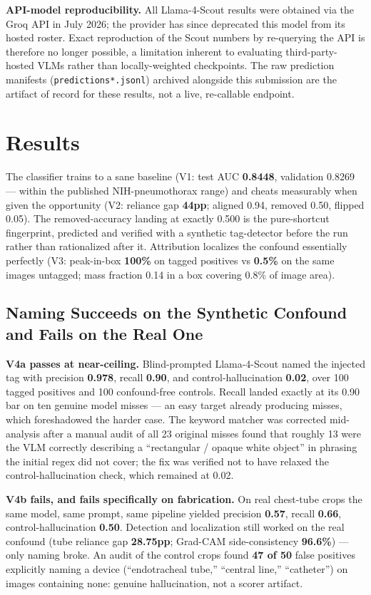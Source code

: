 \documentclass{ieeeaccess}
\begin{document}
\textbf{API-model reproducibility.} All Llama-4-Scout results were obtained via the Groq API in July 2026; the provider has since deprecated this model from its hosted roster. Exact reproduction of the Scout numbers by re-querying the API is therefore no longer possible, a limitation inherent to evaluating third-party-hosted VLMs rather than locally-weighted checkpoints. The raw prediction manifests (\texttt{predictions*.jsonl}) archived alongside this submission are the artifact of record for these results, not a live, re-callable endpoint.

\section{Results}
The classifier trains to a sane baseline (V1: test AUC \textbf{0.8448}, validation 0.8269 --- within the published NIH-pneumothorax range) and cheats measurably when given the opportunity (V2: reliance gap \textbf{44pp}; aligned 0.94, removed 0.50, flipped 0.05). The removed-accuracy landing at exactly 0.500 is the pure-shortcut fingerprint, predicted and verified with a synthetic tag-detector before the run rather than rationalized after it. Attribution localizes the confound essentially perfectly (V3: peak-in-box \textbf{100\%} on tagged positives vs \textbf{0.5\%} on the same images untagged; mass fraction 0.14 in a box covering 0.8\% of image area).

\subsection{Naming Succeeds on the Synthetic Confound and Fails on the Real One}
\textbf{V4a passes at near-ceiling.} Blind-prompted Llama-4-Scout named the injected tag with precision \textbf{0.978}, recall \textbf{0.90}, and control-hallucination \textbf{0.02}, over 100 tagged positives and 100 confound-free controls. Recall landed exactly at its 0.90 bar on ten genuine model misses --- an easy target already producing misses, which foreshadowed the harder case. The keyword matcher was corrected mid-analysis after a manual audit of all 23 original misses found that roughly 13 were the VLM correctly describing a ``rectangular / opaque white object'' in phrasing the initial regex did not cover; the fix was verified not to have relaxed the control-hallucination check, which remained at 0.02.

\textbf{V4b fails, and fails specifically on fabrication.} On real chest-tube crops the same model, same prompt, same pipeline yielded precision \textbf{0.57}, recall \textbf{0.66}, control-hallucination \textbf{0.50}. Detection and localization still worked on the real confound (tube reliance gap \textbf{28.75pp}; Grad-CAM side-consistency \textbf{96.6\%}) --- only naming broke. An audit of the control crops found \textbf{47 of 50} false positives explicitly naming a device (``endotracheal tube,'' ``central line,'' ``catheter'') on images containing none: genuine hallucination, not a scorer artifact.
\end{document}
